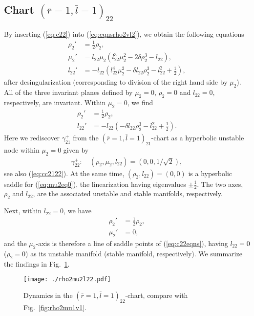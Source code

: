 \documentclass[reqno,12pt]{amsart}
\newcommand{\seclab}[1]{\label{sec:#1}}
\newcommand{\eqlab}[1]{\label{eq:#1}}
\renewcommand{\eqref}[1]{(\ref{eq:#1})}
\newcommand{\figref}[1]{Fig.~\ref{fig:#1}}
\newcommand{\figlab}[1]{\label{fig:#1}}
\numberwithin{equation}{section}
\begin{document}
\subsection{Chart $(\bar r=1,\bar l=1)_{22}$}\seclab{r1l122}
By inserting \eqref{c22} into \eqref{eqnsrho2vl2}, we obtain the following equations
\begin{equation}\eqlab{c22eqns}
\begin{aligned}
 \rho_2' &=\frac12 \rho_2,\\
  \mu_2' &=l_{22} \mu_2\left(l_{22}^3 \mu_2^2-2\delta \rho_2^3 - l_{22}\right),\\
 l_{22}'&=-l_{22}\left(l_{22}^4 \mu_2^2-\delta l_{22}\rho_2^3 -l_{22}^2 + \frac12\right),
\end{aligned}
\end{equation}
after desingularization (corresponding to division of the right hand side by $\mu_2$).
All of the three invariant planes defined by $\mu_2=0$, $\rho_2=0$ and $l_{22}=0$, respectively, are invariant. Within $\mu_2=0$, we find
\begin{equation}\eqlab{mu2eq0}
\begin{aligned}
 \rho_2' &=\frac12 \rho_2,\\
  l_{22}'&=-l_{22}\left(-\delta l_{22}\rho_2^3 -l_{22}^2 + \frac12\right).
\end{aligned}
\end{equation}
Here we rediscover $\gamma_{21}^+$ from the $(\bar r=1,\bar l=1)_{21}$-chart as a hyperbolic unstable node within $\mu_2=0$ given by
\begin{align*}
 \gamma_{22}^+ :\quad (\rho_2,\mu_2,l_{22})=(0,0,1/\sqrt{2}),
\end{align*}
see also \eqref{cc2122}. At the same time, $(\rho_2,l_{22})=(0,0)$ is a hyperbolic saddle for \eqref{mu2eq0}, the linearization having eigenvalues $\pm \frac12$. The two axes, $\rho_2$ and $l_{22}$, are the associated unstable and stable manifolds, respectively. 

Next, within $l_{22}=0$, we have 
\begin{align*}
 \rho_2' &=\frac12 \rho_2,\\
 \mu_2' &=0,
\end{align*}
and the $\mu_2$-axis is therefore a line of saddle points of \eqref{c22eqns}, having $l_{22}=0$ ($\rho_2=0$) as its unstable manifold (stable manifold, respectively). We summarize the findings in \figref{rho2mu2l22}.
\begin{figure}[h!]
 	\begin{center}
 		{\texttt{[image: ./rho2mu2l22.pdf]}}
 		\caption{Dynamics in the $(\bar r=1,\bar l=1)_{22}$-chart, compare with  \figref{rho2mu1v1}.}\figlab{rho2mu2l22}
 	\end{center}
 \end{figure}
\end{document}
